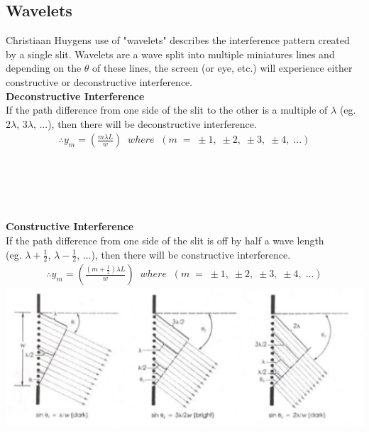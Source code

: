 \documentclass{article}
\begin{document}
\subsection{Wavelets}
Christiaan Huygens use of "wavelets" describes the interference pattern created by a single slit. Wavelets are a wave split into multiple miniatures lines and depending on the $\theta$ of these lines, the screen (or eye, etc.) will experience either constructive or deconstructive interference.\\

\noindent\textbf{Deconstructive Interference}\\
If the path difference from one side of the slit to the other is a multiple of $\lambda$ (eg. $2\lambda$, $3\lambda$, ...), then there will be deconstructive interference.
\begin{align*}
    \therefore y_m = \left(\frac{m\lambda L}{w}\right)\;\; where\;\;(m\;=\;\pm 1,\;\pm 2,\;\pm 3,\;\pm 4,\;...)
\end{align*}\leavevmode\\\\\\\\\\

\noindent\textbf{Constructive Interference}\\
If the path difference from one side of the slit is off by half a wave length\\(eg. $\lambda + \frac{1}{2}$, $\lambda - \frac{1}{2}$, ...), then there will be constructive interference.
\begin{align*}
    \therefore y_m = \left(\frac{(m + \frac{1}{2})\lambda L}{w}\right)\;\; where\;\;(m\;=\;\pm 1,\;\pm 2,\;\pm 3,\;\pm 4,\;...)
\end{align*}\leavevmode
\includegraphics[scale=0.8]{images/wavelets} \\
\end{document}
